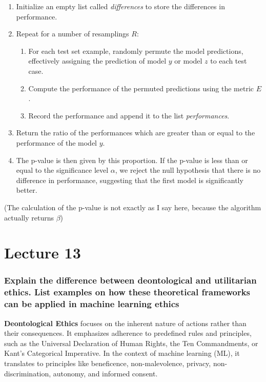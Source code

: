 \documentclass[11pt]{article}
\begin{document}
\begin{enumerate}
    \item Initialize an empty list called \textit{differences} to store the differences in performance.
    \item Repeat for a number of resamplings \( R \):
    \begin{enumerate}
        \item For each test set example, randomly permute the model predictions, effectively assigning the prediction of model \( y \) or model \( z \) to each test case.
        \item Compute the performance of the permuted predictions using the metric \( E \).
        \item Record the performance and append it to the list \textit{performances}.
    \end{enumerate}
    \item Return the ratio of the performances which are greater than or equal to the performance of the model $y$.
    \item The p-value is then given by this proportion. If the p-value is less than or equal to the significance level \( \alpha \), we reject the null hypothesis that there is no difference in performance, suggesting that the first model is significantly better.
\end{enumerate}

(The calculation of the p-value is not exactly as I say here, because the algorithm actually returns $\beta$)

\part{Lecture 13}


\section{Explain the difference between deontological and utilitarian ethics. List examples on how these theoretical frameworks can be applied in machine learning ethics}

\textbf{Deontological Ethics} focuses on the inherent nature of actions rather than their consequences. It emphasizes adherence to predefined rules and principles, such as the Universal Declaration of Human Rights, the Ten Commandments, or Kant's Categorical Imperative. In the context of machine learning (ML), it translates to principles like beneficence, non-malevolence, privacy, non-discrimination, autonomy, and informed consent.
\end{document}
